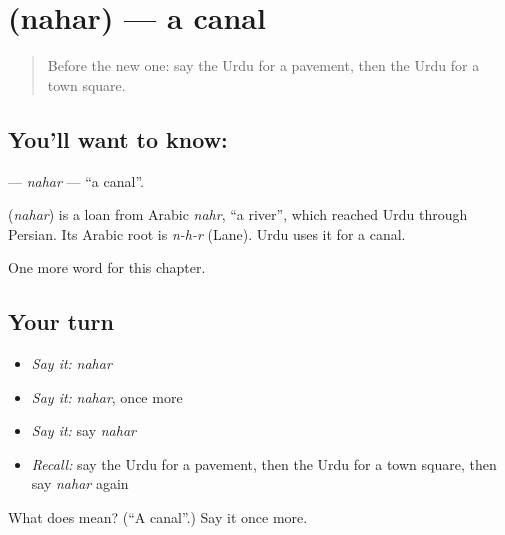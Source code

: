 \section[\texorpdfstring{\ur{نہر} (nahar)}{نہر (nahar)}]{ (nahar) — a canal}

\label{lesson:UR-C157-nahar}



\begin{quote}
Before the new one: say the Urdu for a pavement, then the Urdu for a town square.
\end{quote}

\subsection*{You'll want to know: }
\textbf{} — \emph{nahar} — \textquotedblleft{}a canal\textquotedblright{}.

\begin{cousinweb}
\textbf{} (\emph{nahar}) is a loan from Arabic \emph{nahr}, \textquotedblleft{}a river\textquotedblright{}, which reached Urdu through Persian. Its Arabic root is \emph{n-h-r} (Lane). Urdu uses it for a canal.
\end{cousinweb}

\begin{grammarlens}[title={What you've built}]
One more word for this chapter.
\end{grammarlens}

\subsection*{Your turn}
\begin{itemize}
\raggedright
  \item \emph{Say it:} \emph{nahar}
  \item \emph{Say it:} \emph{nahar}, once more
  \item \emph{Say it:} say \emph{nahar}
  \item \emph{Recall:} say the Urdu for a pavement, then the Urdu for a town square, then say \emph{nahar} again
\end{itemize}

\begin{tcolorbox}[breakable,colback=teal!4,colframe=teal!35!black,title={Before you move on}]
What does  mean? (\textquotedblleft{}A canal\textquotedblright{}.) Say it once more.
\end{tcolorbox}
